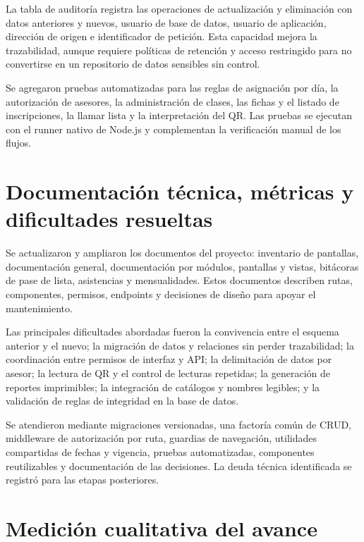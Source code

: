 \documentclass[12pt,a4paper,oneside]{report}
\begin{document}
La tabla de auditoría registra las operaciones de actualización y eliminación con datos anteriores y nuevos, usuario de base de datos, usuario de aplicación, dirección de origen e identificador de petición. Esta capacidad mejora la trazabilidad, aunque requiere políticas de retención y acceso restringido para no convertirse en un repositorio de datos sensibles sin control.

Se agregaron pruebas automatizadas para las reglas de asignación por día, la autorización de asesores, la administración de clases, las fichas y el listado de inscripciones, la llamar lista y la interpretación del QR. Las pruebas se ejecutan con el runner nativo de Node.js y complementan la verificación manual de los flujos.

\section{Documentación técnica, métricas y dificultades resueltas}

Se actualizaron y ampliaron los documentos del proyecto: inventario de pantallas, documentación general, documentación por módulos, pantallas y vistas, bitácoras de pase de lista, asistencias y mensualidades. Estos documentos describen rutas, componentes, permisos, endpoints y decisiones de diseño para apoyar el mantenimiento.

Las principales dificultades abordadas fueron la convivencia entre el esquema anterior y el nuevo; la migración de datos y relaciones sin perder trazabilidad; la coordinación entre permisos de interfaz y API; la delimitación de datos por asesor; la lectura de QR y el control de lecturas repetidas; la generación de reportes imprimibles; la integración de catálogos y nombres legibles; y la validación de reglas de integridad en la base de datos.

Se atendieron mediante migraciones versionadas, una factoría común de CRUD, middleware de autorización por ruta, guardias de navegación, utilidades compartidas de fechas y vigencia, pruebas automatizadas, componentes reutilizables y documentación de las decisiones. La deuda técnica identificada se registró para las etapas posteriores.

\section{Medición cualitativa del avance}
\end{document}
